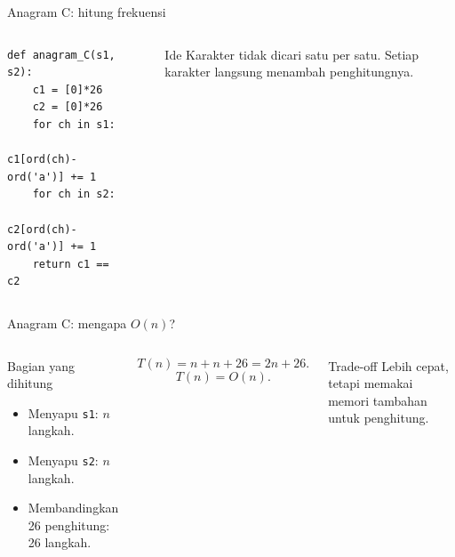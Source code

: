 \documentclass[aspectratio=169,11pt]{beamer}
\begin{document}
\begin{frame}[fragile]{Anagram C: hitung frekuensi}
\begin{columns}[T]
\begin{lstlisting}[basicstyle=\ttfamily\scriptsize]
def anagram_C(s1, s2):
    c1 = [0]*26
    c2 = [0]*26
    for ch in s1:
        c1[ord(ch)-ord('a')] += 1
    for ch in s2:
        c2[ord(ch)-ord('a')] += 1
    return c1 == c2
\end{lstlisting}
\begin{center}
\end{center}
\begin{block}{Ide}
Karakter tidak dicari satu per satu. Setiap karakter langsung menambah penghitungnya.
\end{block}
\end{columns}
\end{frame}

\begin{frame}{Anagram C: mengapa $O(n)$?}
\begin{columns}[T]
\begin{block}{Bagian yang dihitung}
\begin{itemize}
\item Menyapu \texttt{s1}: $n$ langkah.
\item Menyapu \texttt{s2}: $n$ langkah.
\item Membandingkan 26 penghitung: 26 langkah.
\end{itemize}
\end{block}
\[
T(n)=n+n+26=2n+26.
\]
\pause
\[
T(n)=O(n).
\]
\pause
\begin{alertblock}{Trade-off}
Lebih cepat, tetapi memakai memori tambahan untuk penghitung.
\end{alertblock}
\end{columns}
\end{frame}
\end{document}
